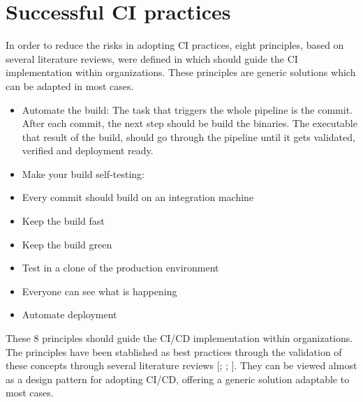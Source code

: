 \section{Successful CI practices}
\label{ci-successful-pract}

In order to reduce the risks in adopting CI practices, eight principles, based on several literature reviews, were defined in \citep{Rejstrom2016} which should guide the CI implementation within organizations. These principles are generic solutions which can be adapted in most cases.

\begin{itemize}
\item Automate the build: The task that triggers the whole pipeline is the commit. After each commit, the next step should be build the binaries. The executable that result of the build, should go through the pipeline until it gets validated, verified and deployment ready.
\item Make your build self-testing: 
\item Every commit should build on an integration machine
\item Keep the build fast
\item Keep the build green
\item Test in a clone of the production environment
\item Everyone can see what is happening
\item Automate deployment
\end{itemize}

These 8 principles should guide the CI/CD implementation within organizations. The principles have been stablished as best practices through the validation of these concepts through several literature reviews [\cite{Rodriguez2016}; \cite{Mantyla2015}; \cite{Stahl2014}]. They can be viewed almost as a design pattern for adopting CI/CD, offering a generic solution adaptable to most cases.